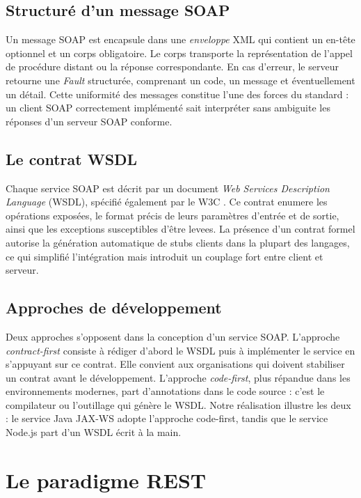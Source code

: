 \subsection{Structuré d'un message SOAP}

Un message SOAP est encapsule dans une \emph{enveloppe} XML qui contient un en-tête optionnel et un corps obligatoire. Le corps transporte la représentation de l'appel de procédure distant ou la réponse correspondante. En cas d'erreur, le serveur retourne une \emph{Fault} structurée, comprenant un code, un message et éventuellement un détail. Cette uniformité des messages constitue l'une des forces du standard : un client SOAP correctement implémenté sait interpréter sans ambiguite les réponses d'un serveur SOAP conforme.

\subsection{Le contrat WSDL}

Chaque service SOAP est décrit par un document \emph{Web Services Description Language} (WSDL), spécifié également par le W3C \citep{w3cwsdl2001}. Ce contrat enumere les opérations exposées, le format précis de leurs paramètres d'entrée et de sortie, ainsi que les exceptions susceptibles d'être levees. La présence d'un contrat formel autorise la génération automatique de stubs clients dans la plupart des langages, ce qui simplifié l'intégration mais introduit un couplage fort entre client et serveur.

\subsection{Approches de développement}

Deux approches s'opposent dans la conception d'un service SOAP. L'approche \emph{contract-first} consiste à rédiger d'abord le WSDL puis à implémenter le service en s'appuyant sur ce contrat. Elle convient aux organisations qui doivent stabiliser un contrat avant le développement. L'approche \emph{code-first}, plus répandue dans les environnements modernes, part d'annotations dans le code source : c'est le compilateur ou l'outillage qui génère le WSDL. Notre réalisation illustre les deux : le service Java JAX-WS adopte l'approche code-first, tandis que le service Node.js part d'un WSDL écrit à la main.

\section{Le paradigme REST}

